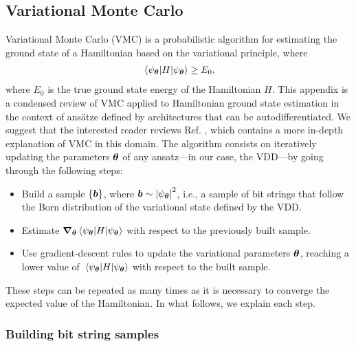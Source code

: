 \documentclass{ieeeaccess}
\begin{document}



\appendix
\section{}
\subsection{Variational Monte Carlo}\label{sec:vmc}

Variational Monte Carlo (VMC) is a probabilistic algorithm for estimating the ground state of a Hamiltonian based on the variational principle, where
\begin{align}
     \expval{H}{\psi_{\vb*{\theta}}} \ge E_0,
\end{align}
where $E_0$ is the true ground state energy of the Hamiltonian $H$.
This appendix is a condensed review of VMC applied to Hamiltonian ground state estimation in the context of ansätze defined by architectures that can be autodifferentiated.
We suggest that the interested reader reviews Ref. \cite{netket3}, which contains a more in-depth explanation of VMC in this domain.
The algorithm consists on iteratively updating the parameters $\vb*{\theta}$ of any ansatz---in our case, the VDD---by going through the following steps:
\begin{itemize}
    \item Build a sample $\{\vb*{b}\}$, where $\vb*{b}\sim\abs{\psi_{\vb*{\theta}}}^2$, i.e., a sample of bit strings that follow the Born distribution of the variational state defined by the VDD.
    \item Estimate $\grad_{\vb*{\theta}} \expval{H}{\psi_{\vb*{\theta}}}$ with respect to the previously built sample.
    \item Use gradient-descent rules to update the variational parameters $\vb*{\theta}$, reaching a lower value of $\expval{H}{\psi_{\vb*{\theta}}}$ with respect to the built sample.
\end{itemize}
These steps can be repeated as many times as it is necessary to converge the expected value of the Hamiltonian.
In what follows, we explain each step.
\subsubsection{Building bit string samples}
\end{document}
